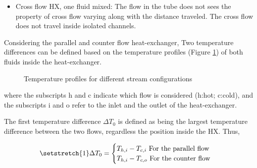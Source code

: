 \begin{itemize}
\item Cross flow HX, one fluid mixed: The flow in the tube does not sees the property of cross flow varying along with the distance traveled. The cross flow does not travel inside isolated channels.
\end{itemize}

Considering the parallel and counter flow heat-exchanger, Two temperature differences can be defined based on the temperature profiles (Figure \ref{fig:C3_Tprof}) of both fluids inside the heat-exchanger.

\begin{figure}[h]
\centering
{}\hfill
{}\caption{Temperature profiles for different stream configurations}\label{fig:C3_Tprof}
\end{figure}

where the subscripts h and c indicate which flow is considered (h:hot; c:cold), and the subscripts i and o refer to the inlet and the outlet of the heat-exchanger.

The first temperature difference $\Delta T_0$ is defined as being the largest temperature difference between the two flows, regardless the position inside the HX. Thus,

\begin{equation}
\setstretch{1}
\Delta T_0 =
\begin{cases}
T_{h,i} - T_{c,i} \text{ For the parallel flow}\\
T_{h,i} - T_{c,o} \text{ For the counter flow}\\
\end{cases}\label{eq:C3_DT0}
\end{equation}

